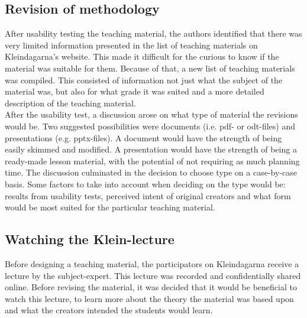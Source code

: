 \subsection{Revision of methodology}
After usability testing the teaching material, the authors identified that there was very limited information presented in the list of teaching materials on Kleindagarna's website. This made it difficult for the curious to know if the material was suitable for them. Because of that, a new list of teaching materials was compiled. This consisted of information not just what the subject of the material was, but also for what grade it was suited and a more detailed description of the teaching material.\\
After the usability test, a discussion arose on what type of material the revisions would be. Two suggested possibilities were documents (i.e. pdf- or odt-files) and presentations (e.g. pptx-files). A document would have the strength of being easily skimmed and modified. A presentation would have the strength of being a ready-made lesson material, with the potential of not requiring as much planning time. The discussion culminated in the decision to choose type on a case-by-case basis. Some factors to take into account when deciding on the type would be: results from usability tests, perceived intent of original creators and what form would be most suited for the particular teaching material.
\subsection{Watching the Klein-lecture}
Before designing a teaching material, the participators on Kleindagarna receive a lecture by the subject-expert. This lecture was recorded and confidentially shared online. Before revising the material, it was decided that it would be beneficial to watch this lecture, to learn more about the theory the material was based upon and what the creators intended the students would learn.
